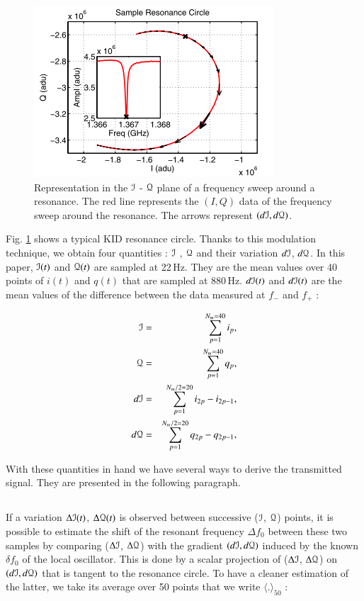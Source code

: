 \begin{figure}[h]
\center
	\includegraphics[scale=0.8]{Figures/resonance-circle.png}
	\caption{Representation in the $\mathcal{I}$ - $\mathcal{Q}$ plane of a
          frequency sweep around a resonance. The red line represents the
          $(I,Q)$ data of the frequency sweep around the resonance. The arrows
          represent $(d\mathcal{I}, d\mathcal{Q})$. \citep{2013A&A...551L..12C}}
	\label{circle-iq}
\end{figure}

Fig. \ref{circle-iq} shows a typical KID resonance circle. Thanks to this
modulation technique, we obtain four quantities : $\mathcal{I}$ , $\mathcal{Q}$ and their
variation $d\mathcal{I}$, $d\mathcal{Q}$. In this paper, $\mathcal{I}(t)$ and $\mathcal{Q}(t)$ are sampled at
22\,Hz. They are the mean values over 40 points of $i(t)$ and $q(t)$ that are
sampled at 880\,Hz. $d\mathcal{I}(t)$ and $d\mathcal{I}(t)$ are the mean values of the difference
between the data measured at $f_{-}$ and $f_{+}$ : 

\begin{eqnarray}
\mathcal{I}  &=& \sum^{N_{m}=40}_{p=1} i_{p},\\
\mathcal{Q}  &=& \sum^{N_{m}=40}_{p=1} q_{p},\\
d\mathcal{I} &=& \sum^{N_{m}/2=20}_{p=1} i_{2p} - i_{2p-1},\\
d\mathcal{Q} &=& \sum^{N_{m}/2=20}_{p=1} q_{2p} - q_{2p-1},
\end{eqnarray}


With these quantities in hand we have several ways to derive the transmitted
signal. They are presented in the following paragraph.

\subsection{\rf}
If a variation $\Delta\mathcal{I}(t)$, $\Delta\mathcal{Q}(t)$ is observed between successive ($\mathcal{I}$,
$\mathcal{Q}$) points, it is possible to estimate the shift of the resonant frequency
$\Delta f_{0}$ between these two samples by comparing ($\Delta \mathcal{I}$, $\Delta \mathcal{Q}$)
with the gradient $(d\mathcal{I},d\mathcal{Q})$ induced by the known $\delta
f_{0}$ of the local oscillator. This is done by a scalar projection of ($\Delta\mathcal{I}$,
$\Delta\mathcal{Q}$) on $(d\mathcal{I},d\mathcal{Q})$ that is tangent to the resonance circle. To have a
cleaner estimation of the latter, we take its average over 50
points that we write $\langle . \rangle_{50}$ \citep{2014A&A...569A...9C}:

